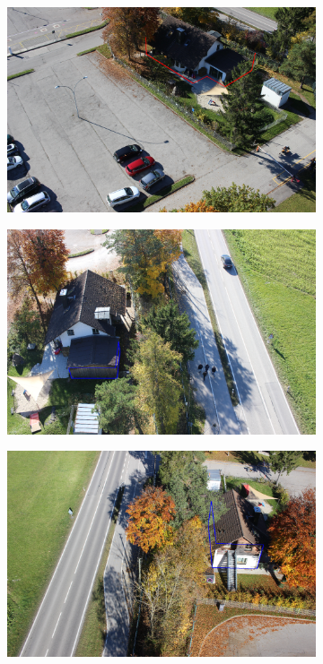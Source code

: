 \begin{figure}[H]
\begin{subfigure}[tbp]{0.31\columnwidth}
           \includegraphics[width=\textwidth]{optimize/IMG_1400_osm_ori.png}
           \caption[]{}%
           {{\small }}   
           \label{fig:5i}
       \end{subfigure}
       \begin{subfigure}[tbp]{0.31\columnwidth}
           \centering
           \includegraphics[width=\textwidth]{optimize/IMG_1367_xyzh.png}
           \caption[]{}%
           {{\small }}
           \label{fig:5j}
       \end{subfigure}
       \begin{subfigure}[tbp]{0.31\columnwidth}  
           \centering 
           \includegraphics[width=\textwidth]{optimize/IMG_1604_xyzh.png}

\end{subfigure}
\end{figure}
